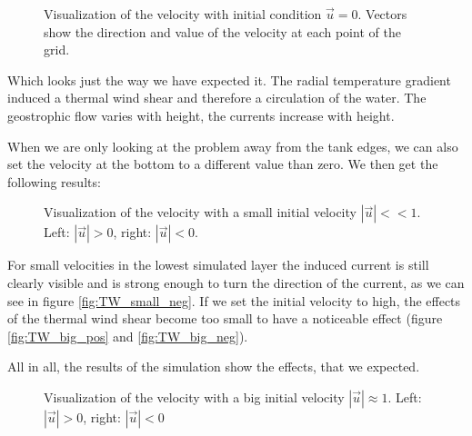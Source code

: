 \documentclass[12pt, a4paper]{article} %
\newcommand{\todoFormat}{\todo[color=blue!20]}
\begin{document}
			\begin{figure}[h]
				\centering
					\qquad
				\caption{Visualization of the velocity with initial condition $\vec{u}=0$. Vectors show the direction and value of the velocity at each point of the grid.}
			\end{figure}
			
			Which looks just the way we have expected it. The radial temperature gradient induced a thermal wind shear and therefore a circulation of the water. The geostrophic flow varies with height, the currents increase with height.
			
			When we are only looking at the problem away from the tank edges, we can also set the velocity  at the bottom to a different value than zero. We then get the following results:
			\todoFormat{anders schreiben}
			
			\begin{figure}[ht]
				\centering
					\qquad
				\caption{Visualization of the velocity with a small initial velocity $|\vec{u}|<<1$. Left: $|\vec{u}|>0$, right: $|\vec{u}|<0$.}
			\end{figure}
			
			
			For small velocities in the lowest simulated layer the induced current is still clearly visible and is strong enough to turn the direction of the current, as we can see in figure \ref{fig:TW_small_neg}. If we set the initial velocity to high, the effects of the thermal wind shear become too small to have a noticeable effect (figure \ref{fig:TW_big_pos} and \ref{fig:TW_big_neg}).
			
			All in all, the results of the simulation show the effects, that we expected. 
			
			\begin{figure}[H]
				\centering
					\qquad
				\caption{Visualization of the velocity with a big initial velocity $|\vec{u}| \approx 1$. Left: $|\vec{u}|>0$, right: $|\vec{u}|<0$}
			\end{figure}
	\newpage
\end{document}
